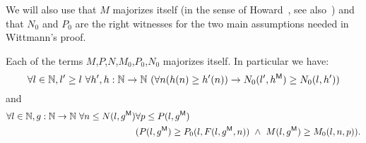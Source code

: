We will also use that $M$ majorizes itself (in the sense of Howard~\cite{Howard73}, see also~\cite{Kohlenbach08}) and that $N_0$ and $P_0$ are the right witnesses for the two main assumptions needed in Wittmann's proof. 

\begin{lemma}[$M$ is a majorant]\label{l:M}
Each of the terms $M$,$P$,$N$,$M_0$,$P_0$,$N_0$ majorizes itself.
In particular we have:
\[ \forall l\in\NN,l'\geq l\ \forall h',h:\NN\to\NN\ ( \forall n (h(n)\geq h'(n)) \rightarrow N_0(l',h\powM)\geq N_0(l,h') ) \]
and
\begin{align*}
 \forall l\in\mathbb{N},g:\mathbb{N}\to\mathbb{N}\ \forall n\leq N(l,g\protect{^{\textsf{\upshape M}}}) &\forall p\leq P(l,g\protect{^{\textsf{\upshape M}}})\\
  &( P(l,g\protect{^{\textsf{\upshape M}}})\geq P_0(l,F(l,g\protect{^{\textsf{\upshape M}}},n))\ \wedge\ M(l,g\protect{^{\textsf{\upshape M}}})\geq M_0(l,n,p) ) . 
\end{align*}
\end{lemma}



